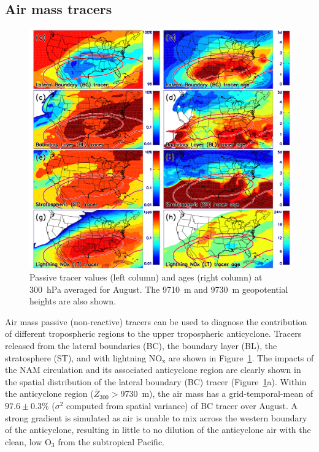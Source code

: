 \subsection{Air mass tracers}\label{sect:diag/passive}

 \begin{figure}
 \noindent\includegraphics[width=40pc]{Figures/tracer_maps.png}
 \caption[August mean passive tracer at 300~hPa]{Passive tracer values (left column) and ages (right column) at 300~hPa averaged for August. The
9710~m and 9730~m geopotential heights are also shown.}
 \label{fig:tracer}
 \end{figure}

Air mass passive (non-reactive) tracers can be used to diagnose the contribution of different tropospheric
regions to the upper tropospheric anticyclone. Tracers released from the lateral
boundaries (BC), the boundary layer (BL), the stratosphere (ST), and with lightning
NO$_{\mathrm{x}}$ are shown in Figure~\ref{fig:tracer}. The impacts of the NAM circulation
and its associated anticyclone region are
clearly shown in the spatial distribution of the lateral boundary (BC) tracer
(Figure~\ref{fig:tracer}a). Within the anticyclone region ($\overline Z_{300}>$9730~m),
the air mass has a grid-temporal-mean of $97.6\pm0.3\%$ ($\sigma^2$ computed from
spatial variance) of BC tracer over August. A strong
gradient is simulated as air is unable to mix across the western boundary of the anticyclone,
resulting in little to no dilution of the anticyclone air with the clean, low O$_3$ from the subtropical Pacific.

